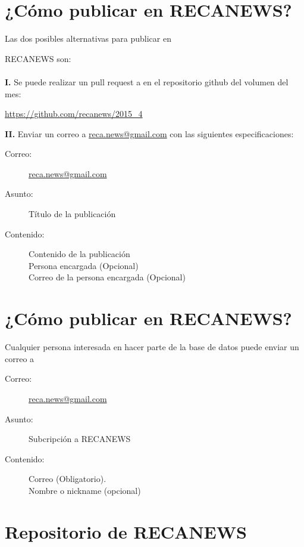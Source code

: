 \section*{¿Cómo publicar en RECANEWS?}
Las dos posibles alternativas para publicar en\par RECANEWS son:\\
\\
\textbf{I.} Se puede realizar un pull request a en el repositorio github del volumen del mes:
\begin{center}
 \url{https://github.com/recanews/2015_4}
\end{center}

\noindent \textbf{II.} Enviar un correo a \url{reca.news@gmail.com} con las siguientes especificaciones:
\begin{description}
\item[Correo:]\url{reca.news@gmail.com}
\item[Asunto:]Título de la publicación
\item[Contenido:]Contenido de la publicación\\
Persona encargada (Opcional)\\
Correo de la persona encargada (Opcional)
\end{description}
  

\section*{¿Cómo publicar en RECANEWS?}

Cualquier persona interesada en hacer parte de la base de datos puede enviar un correo a 
\begin{description}
\item[Correo:]\url{reca.news@gmail.com}
\item[Asunto:]Subcripción a RECANEWS
\item[Contenido:]Correo (Obligatorio).\\
Nombre o nickname (opcional)
\end{description}

\section*{Repositorio de RECANEWS}

